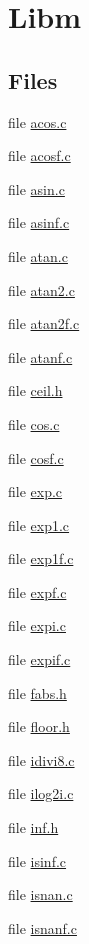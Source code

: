 \hypertarget{group__libm}{\section{Libm}
\label{group__libm}
}
\subsection*{Files}
\begin{DoxyCompactItemize}
\item 
file \hyperlink{acos_8c}{acos.\-c}
\item 
file \hyperlink{acosf_8c}{acosf.\-c}
\item 
file \hyperlink{asin_8c}{asin.\-c}
\item 
file \hyperlink{asinf_8c}{asinf.\-c}
\item 
file \hyperlink{atan_8c}{atan.\-c}
\item 
file \hyperlink{atan2_8c}{atan2.\-c}
\item 
file \hyperlink{atan2f_8c}{atan2f.\-c}
\item 
file \hyperlink{atanf_8c}{atanf.\-c}
\item 
file \hyperlink{ceil_8h}{ceil.\-h}
\item 
file \hyperlink{cos_8c}{cos.\-c}
\item 
file \hyperlink{cosf_8c}{cosf.\-c}
\item 
file \hyperlink{exp_8c}{exp.\-c}
\item 
file \hyperlink{exp1_8c}{exp1.\-c}
\item 
file \hyperlink{exp1f_8c}{exp1f.\-c}
\item 
file \hyperlink{expf_8c}{expf.\-c}
\item 
file \hyperlink{expi_8c}{expi.\-c}
\item 
file \hyperlink{expif_8c}{expif.\-c}
\item 
file \hyperlink{fabs_8h}{fabs.\-h}
\item 
file \hyperlink{floor_8h}{floor.\-h}
\item 
file \hyperlink{idivi8_8c}{idivi8.\-c}
\item 
file \hyperlink{ilog2i_8c}{ilog2i.\-c}
\item 
file \hyperlink{inf_8h}{inf.\-h}
\item 
file \hyperlink{isinf_8c}{isinf.\-c}
\item 
file \hyperlink{isnan_8c}{isnan.\-c}
\item 
file \hyperlink{isnanf_8c}{isnanf.\-c}
\item 

\end{DoxyCompactItemize}
